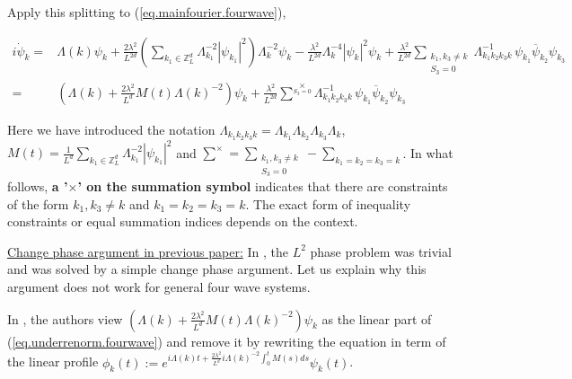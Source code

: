 Apply this splitting to (\ref{eq.mainfourier.fourwave}),

\begin{equation}\label{eq.underrenorm.fourwave}
\begin{split}
i \dot{\psi}_{k} =& \Lambda(k) \psi_k
+\frac{2\lambda^2}{L^{2d}} \left(\sum\limits_{k_1\in \mathbb{Z}^d_L} \Lambda_{k_1}^{-2}|\psi_{k_1}|^2 \right) \Lambda_{k}^{-2}\psi_{k}
-\frac{\lambda^2}{L^{2d}} \Lambda_{k}^{-4}|\psi_{k}|^2 \psi_{k}
+\frac{\lambda^2}{L^{2d}} \sum\limits_{\substack{k_1, k_3\neq k \\ S_3=0}} \Lambda_{k_1k_2k_3k}^{-1}\,\psi_{k_1}\overline{\psi}_{k_2} \psi_{k_3}
\\
=& \left(\Lambda(k)+\frac{2\lambda^2}{L^{d}} M(t)\Lambda(k)^{-2}\right) \psi_k
+\frac{\lambda^2}{L^{2d}} \sum^{\times}\limits_{S_3=0} \Lambda_{k_1k_2k_3k}^{-1}\,\psi_{k_1}\overline{\psi}_{k_2} \psi_{k_3}
\end{split}
\end{equation}

Here we have introduced the notation $\Lambda_{k_1k_2k_3k}=\Lambda_{k_1}\Lambda_{k_2}\Lambda_{k_3}\Lambda_{k}$, $M(t)=\frac{1}{L^{d}} \sum\limits_{k_1\in \mathbb{Z}^d_L} \Lambda_{k_1}^{-2}|\psi_{k_1}|^2$ and $\sum^{\times}=\sum\limits_{\substack{k_1, k_3\neq k \\ S_3=0}}-\sum_{k_1=k_2=k_3=k}$. In what follows, \textbf{a '$\times$' on the summation symbol} indicates that there are constraints of the form $k_1, k_3\neq k$ and $k_1=k_2=k_3=k$. The exact form of inequality constraints or equal summation indices depends on the context. 

\underline{Change phase argument in previous paper:} In \cite{deng2021derivation}, the $L^2$ phase problem was trivial and was solved by a simple change phase argument. Let us explain why this argument does not work for general four wave systems.

In \cite{deng2021derivation}, the authors view $\left(\Lambda(k)+\frac{2\lambda^2}{L^{d}} M(t)\Lambda(k)^{-2}\right) \psi_k$ as the linear part of (\ref{eq.underrenorm.fourwave}) and remove it by rewriting the equation in term of the linear profile $\phi_k(t):= e^{i\Lambda(k) t+\frac{2\lambda^2}{L^{d}} i \Lambda(k)^{-2}\int^t_{0}M(s) ds} \psi_k(t)$.
 
